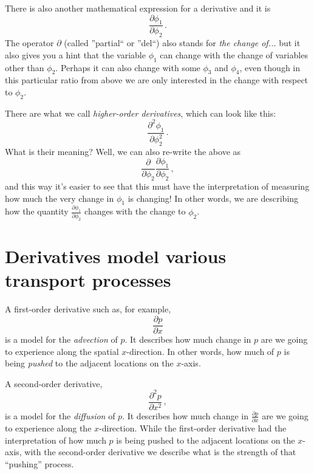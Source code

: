 There is also another mathematical expression for a derivative and it is
\begin{equation*}\label{eq:change-partial}
\frac{\partial \phi_1}{\partial \phi_2} \, .
\end{equation*}
The operator $\partial$ (called ''partial`` or ''del``) also stands for \textit{the change of...} but it also gives you a hint that the variable $\phi_1$ can change with the change of variables other than $\phi_2$. Perhaps it can also change with some $\phi_3$ and $\phi_4$, even though in this particular ratio from above we are only interested in the change with respect to $\phi_2$.

There are what we call \textit{higher-order derivatives}, which can look like this:
\begin{equation*}\label{eq:change-partial-2nd}
\frac{\partial^2 \phi_1}{\partial \phi_2^2} \, .
\end{equation*}
What is their meaning? Well, we can also re-write the above as
\begin{equation*}\label{eq:change-partial}
\frac{\partial}{\partial \phi_2} \frac{\partial \phi_1}{\partial \phi_2} \, ,
\end{equation*}
and this way it's easier to see that this must have the interpretation of measuring how much the very change in $\phi_1$ is changing! In other words, we are describing how the quantity $\frac{\partial \phi_1}{\partial \phi_2}$ changes with the change to $\phi_2$. 

\section{Derivatives model various transport processes}

A first-order derivative such as, for example,
\begin{equation*}\label{eq:change-partial-1st}
\frac{\partial p}{\partial x}
\end{equation*}
is a model for the \textit{advection} of $p$. It describes how much change in $p$ are we going to experience along the spatial $x$-direction. In other words, how much of $p$ is being \textit{pushed} to the adjacent locations on the $x$-axis.

A second-order derivative,
\begin{equation*}\label{eq:change-partial-2nd}
\frac{\partial^2 p}{\partial x^2} \, ,
\end{equation*}
is a model for the \textit{diffusion} of $p$. It describes how much change in $\frac{\partial p}{\partial x}$ are we going to experience along the $x$-direction. While the first-order derivative had the interpretation of how much $p$ is being pushed to the adjacent locations on the $x$-axis, with the second-order derivative we describe what is the strength of that ``pushing'' process.



